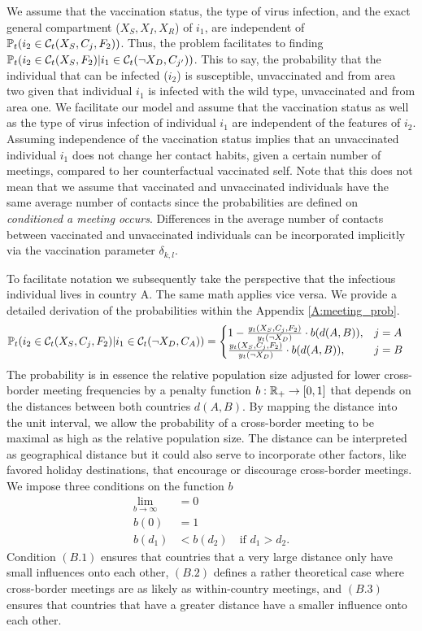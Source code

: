 We assume that the vaccination status, the type of virus infection, and the exact general compartment ($X_S, X_I, X_R$) of $i_1$, are independent of $\mathbb{P}_t(i_2 \in \mathcal{C}_t(X_S, C_j, F_2)) $. Thus, the problem facilitates to finding $\mathbb{P}_t(i_2 \in \mathcal{C}_t(X_S, F_2) | i_1 \in \mathcal{C}_t(\neg X_D, C_{j'}))$. This to say, the probability that the individual that can be infected ($i_2$) is susceptible, unvaccinated and from area two given that individual $i_1$ is infected with the wild type, unvaccinated and from area one. We facilitate our model and assume that the vaccination status as well as the type of virus infection of individual $i_1$ are independent of the features of $i_2$. Assuming independence of the vaccination status implies that an unvaccinated individual $i_1$ does not change her contact habits, given a certain number of meetings, compared to her counterfactual vaccinated self. Note that this does not mean that we assume that vaccinated and unvaccinated individuals have the same average number of contacts since the probabilities are defined on \textit{conditioned a meeting occurs}. Differences in the average number of contacts between vaccinated and unvaccinated individuals can be incorporated implicitly via the vaccination parameter $\delta_{k,l}$.

To facilitate notation we subsequently take the perspective that the infectious individual lives in country A. The same math applies vice versa. We provide a detailed derivation of the probabilities within the Appendix \ref{A:meeting_prob}.
\begin{align}
\label{eq:cond_meeting_prob}
\mathbb{P}_t(i_2 \in \mathcal{C}_t(X_S, C_j, F_2)|i_1 \in \mathcal{C}_t(\neg X_D, C_A)) &= \begin{cases} 
      1-\frac{y_t(X_S, C_j, F_2)}{y_t(\neg X_D)} \cdot b(d(A, B)), & j = A \\
      \frac{y_t(X_S, C_j, F_2)}{y_t(\neg X_D)} \cdot b(d(A, B)), & j = B 
   \end{cases}
\end{align}
The probability is in essence the relative population size adjusted for lower cross-border meeting frequencies by a penalty function $b: \mathbb{R}_+ \to [0,1]$ that depends on the distances between both countries $d(A, B)$. By mapping the distance into the unit interval, we allow the probability of a cross-border meeting to be maximal as high as the relative population size. The distance can be interpreted as geographical distance but it could also serve to incorporate other factors, like favored holiday destinations, that encourage or discourage cross-border meetings. We impose three conditions on the function $b$
\begin{align}
\lim_{b \to \infty} &= 0 \tag{B.1}\\
b(0) &= 1 \tag{B.2}\\
b(d_1) &< b(d_2) \quad \textrm{if } d_1 > d_2. \tag{B.3}
\end{align}
Condition $(B.1)$ ensures that countries that a very large distance only have small influences onto each other, $(B.2)$ defines a rather theoretical case where cross-border meetings are as likely as within-country meetings, and $(B.3)$ ensures that countries that have a greater distance have a smaller influence onto each other. \\

